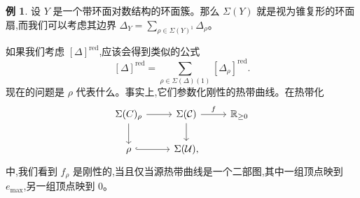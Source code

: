 \documentclass{amsart}
\theoremstyle{definition}
\newtheorem{exm}[thm]{例}
\theoremstyle{remark}
\theoremstyle{plain}
\theoremstyle{definition}
\theoremstyle{remark}
\newcommand{\R}{\mathbb{R}}
\newcommand{\mc}[1]{\mathcal{#1}}
\newcommand{\on}[1]{\operatorname{#1}}
\newcommand{\1}{\mathbf{1}}
\newcommand{\2}{\mathbf{2}}
\newcommand{\3}{\mathbf{3}}
\begin{document}
\begin{exm}
    设 \(Y\) 是一个带环面对数结构的环面簇。那么 \(\Sigma(Y)\) 就是视为锥复形的环面扇,而我们可以考虑其边界 \(\Delta_Y = \sum_{\rho \in \Sigma(Y)^1} \Delta_{\rho}\)。
\end{exm}

如果我们考虑 \([\Delta]^{\on{red}}\),应该会得到类似的公式
\[ [\Delta]^{\on{red}} = \sum_{\rho \in \Sigma(\Delta)(1)} [\Delta_{\rho}]^{\on{red}}. \]
现在的问题是 \(\rho\) 代表什么。事实上,它们参数化刚性的热带曲线。在热带化
\begin{equation*}
\begin{tikzcd}
    \Sigma(C)_{\rho} \ar{d} \ar{r} & \Sigma(\mc{C}) \ar{r}{f} \ar{d} & \R_{\geq 0} \\
    \rho \ar[hookrightarrow]{r} & \Sigma(\mc{U}),
\end{tikzcd}
\end{equation*}
中,我们看到 \(f_{\rho}\) 是刚性的,当且仅当源热带曲线是一个二部图,其中一组顶点映到 \(e_{\max}\),另一组顶点映到 \(0\)。
\end{document}
